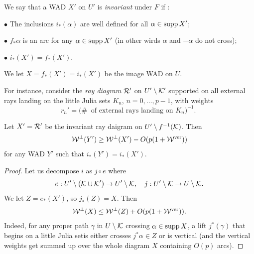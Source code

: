 {{\msk
We say that a WAD $X'$ on $U'$ is {\it invariant} under $F$  if :

\ssk \nin $\bullet$ 
The inclusions $i_*(\alpha)$ are well defined for all $\alpha\in
\operatorname{supp} X'$; 

\ssk \nin $\bullet$ $f_*\alpha$ is an arc for any $\alpha\in \operatorname{supp} X'$
  (in other wirds $\alpha$ and $-\alpha$ do not cross); 

\ssk \nin $\bullet$   $i_*(X')= f_*(X')$.
 

\ssk\nin
We let $X=f_*(X')=i_*(X')$ be the image WAD on $U$. 

\msk
For instance, consider the {\it ray diagram}  ${\mathcal R}'$ on $U'\setminus {\mathcal K}'$ supported on all external rays
landing on the little Julia sets $K_n$, $n =0,\dots, p-1$, with weights
$$
   r_n' =  (\# \ \mbox{ of external rays landing on $K_n )^{-1}$. }
$$

\begin{lem}\label{flux through inv WAD}
    Let $X'={\mathcal R}'$ be the  invariant ray daigram on 
$U'\setminus f^{-1}    ({\mathcal K})$. 
Then
$$
  {\mathcal W}^\perp (Y')\geq {\mathcal W}^\perp (X') - O( p (1 +  {\mathcal W}^{\mathrm {ver}}) ) 
$$ 
for any   WAD $Y'$  such that  $i_* (Y') = i_* (X')$.
\end{lem}

\begin{proof}
Let  us decompose $i$ as $j\circ e$ where
$$
  e : U'\setminus ({\mathcal K}\cup {\mathcal K}') \rightarrow U'\setminus {\mathcal K},\quad j: U' \setminus {\mathcal K} \rightarrow U\setminus {\mathcal K}.
$$
We let $Z = e_*(X')$, so $j_*(Z) = X$.   Then
%
\begin{equation}\label{restricted X}
   {\mathcal W}^\perp (X) \leq {\mathcal W}^\perp (Z) + O(p (1 +  {\mathcal W}^{\mathrm {ver}}) ). 
\end{equation}
Indeed,  for any proper path $\gamma$  in $U\setminus {\mathcal K} $  crossing $\alpha \in \operatorname{supp} X$, 
a lift $j^*(\gamma)$ that begins on a little Julia setis either
crosses $ j^*\alpha\in Z$  or is vertical
 (and the vertical weights
get summed up over the whole diagram $X$ containing $O( p) $ arcs). 

\end{proof}}}
